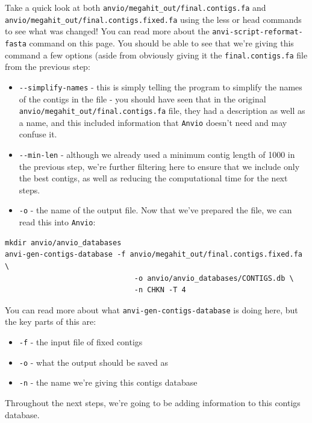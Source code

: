 \documentclass[
]{book}
\providecommand{\tightlist}{%
  \setlength{\itemsep}{0pt}\setlength{\parskip}{0pt}}
\begin{document}
Take a quick look at both \texttt{anvio/megahit\_out/final.contigs.fa} and \texttt{anvio/megahit\_out/final.contigs.fixed.fa} using the less or head commands to see what was changed! You can read more about the \texttt{anvi-script-reformat-fasta} command on this page. You should be able to see that we're giving this command a few options (aside from obviously giving it the \texttt{final.contigs.fa} file from the previous step:

\begin{itemize}
\tightlist
\item
  \texttt{-\/-simplify-names} - this is simply telling the program to simplify the names of the contigs in the file - you should have seen that in the original \texttt{anvio/megahit\_out/final.contigs.fa} file, they had a description as well as a name, and this included information that \texttt{Anvi\textquotesingle{}o} doesn't need and may confuse it.
\item
  \texttt{-\/-min-len} - although we already used a minimum contig length of 1000 in the previous step, we're further filtering here to ensure that we include only the best contigs, as well as reducing the computational time for the next steps.
\item
  \texttt{-o} - the name of the output file.
  Now that we've prepared the file, we can read this into \texttt{Anvi\textquotesingle{}o}:
\end{itemize}

\begin{verbatim}
mkdir anvio/anvio_databases
anvi-gen-contigs-database -f anvio/megahit_out/final.contigs.fixed.fa \
                              -o anvio/anvio_databases/CONTIGS.db \
                              -n CHKN -T 4
\end{verbatim}

You can read more about what \texttt{anvi-gen-contigs-database} is doing here, but the key parts of this are:

\begin{itemize}
\tightlist
\item
  \texttt{-f} - the input file of fixed contigs
\item
  \texttt{-o} - what the output should be saved as
\item
  \texttt{-n} - the name we're giving this contigs database
\end{itemize}

Throughout the next steps, we're going to be adding information to this contigs database.
\end{document}
